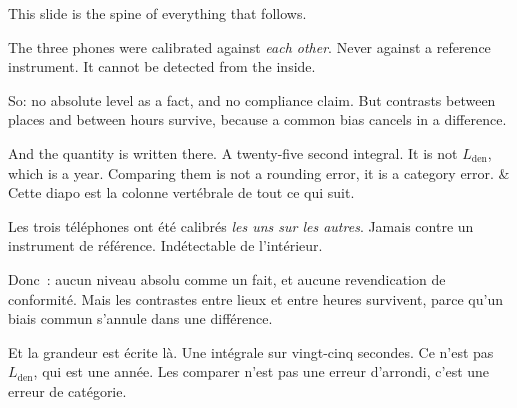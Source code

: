 \documentclass[10pt,a4paper]{article}
\begin{document}
\begin{say}
This slide is the spine of everything that follows.

The three phones were calibrated against \emph{each other}. Never against a
reference instrument.  It cannot be detected from the inside.

So: no absolute level as a fact, and no compliance claim. But contrasts between
places and between hours survive, because a common bias cancels in a difference.

And the quantity is written there. A twenty-five second integral. It is not
$L_\mathrm{den}$, which is a year. Comparing them is not a rounding error, it is a
category error.
&
Cette diapo est la colonne vertébrale de tout ce qui suit.

Les trois téléphones ont été calibrés \emph{les uns sur les autres}. Jamais contre
un instrument de référence.  Indétectable de l'intérieur.

Donc~: aucun niveau absolu comme un fait, et aucune revendication de conformité.
Mais les contrastes entre lieux et entre heures survivent, parce qu'un biais
commun s'annule dans une différence.

Et la grandeur est écrite là. Une intégrale sur vingt-cinq secondes. Ce n'est pas
$L_\mathrm{den}$, qui est une année. Les comparer n'est pas une erreur d'arrondi,
c'est une erreur de catégorie.
\end{say}
\end{document}
